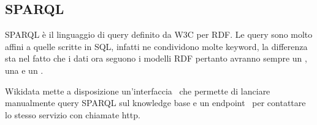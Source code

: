 \subsection{SPARQL}
SPARQL è il linguaggio di query definito da W3C per RDF. Le query sono molto affini a quelle scritte in SQL, infatti ne condividono molte keyword, la differenza sta nel fatto che i dati ora 
seguono i modelli RDF pertanto avranno sempre un , una  e un .

Wikidata mette a disposizione un'interfaccia~\cite{sparql-ui} che permette di lanciare manualmente query SPARQL sul knowledge base
e un endpoint~\cite{sparql-endpoint} per contattare lo stesso servizio con chiamate http. 
